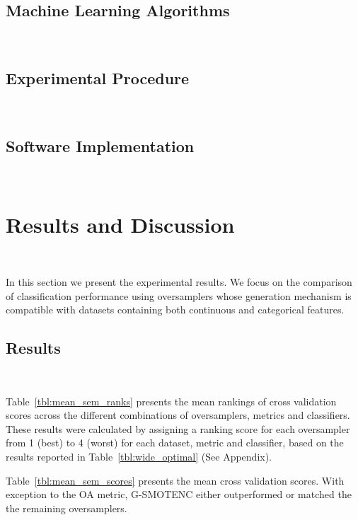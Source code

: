 \documentclass[parskip=full]{scrartcl}
\begin{document}
\subsection{Machine Learning Algorithms}~\label{sec:ml_algorithms}

\subsection{Experimental Procedure}~\label{sec:experimental_procedure}

\subsection{Software Implementation}~\label{sec:software_implementation}

\section{Results and Discussion}~\label{sec:results_and_discussion}

In this section we present the experimental results. We focus on the
comparison of classification performance using oversamplers whose generation
mechanism is compatible with datasets containing both continuous and
categorical features.


\subsection{Results}~\label{sec:results}

Table~\ref{tbl:mean_sem_ranks} presents the mean rankings of cross validation
scores across the different combinations of oversamplers, metrics and
classifiers. These results were calculated by assigning a ranking score for
each oversampler from 1 (best) to 4 (worst) for each dataset, metric and
classifier, based on the results reported in Table~\ref{tbl:wide_optimal} (See
Appendix).



Table~\ref{tbl:mean_sem_scores} presents the mean cross validation scores.
With exception to the OA metric, G-SMOTENC either outperformed or matched the
the remaining oversamplers.


\end{document}
